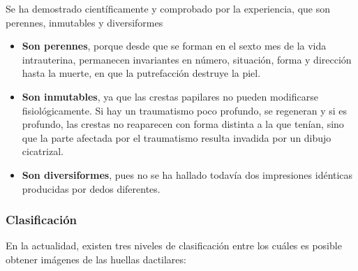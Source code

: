 Se ha demostrado científicamente y comprobado por la experiencia, que son perennes, inmutables y diversiformes 



\begin{itemize}
\item\textbf{Son perennes}, porque desde que se forman en el sexto mes de la vida intrauterina, permanecen invariantes en número, situación, forma y dirección hasta la muerte, en que la putrefacción destruye la piel.
\item\textbf{Son inmutables}, ya que las crestas papilares no pueden modificarse   fisiológicamente. Si hay un traumatismo poco profundo, se regeneran y si es profundo, las crestas no reaparecen con forma distinta a la que tenían, sino que la parte afectada por el traumatismo resulta invadida por un dibujo cicatrizal.
\item\textbf{Son diversiformes}, pues no se ha hallado todavía dos impresiones idénticas producidas por dedos diferentes.
\end{itemize}


\subsubsection*{Clasificación}

En la  actualidad, existen tres niveles de clasificación entre los cuáles es posible obtener imágenes de las huellas dactilares:

